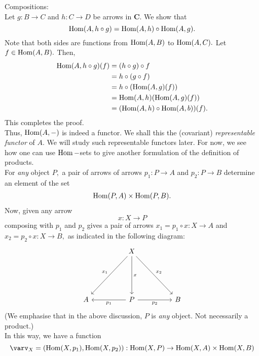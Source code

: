 Compositions:\\
Let $g:B\to C$ and $h:C\to D$ be arrows in $\mathbf{C}.$ We show that
\begin{equation*} 
	\operatorname{Hom}(A, h\circ g) = \operatorname{Hom}(A, h)\circ\operatorname{Hom}(A, g).
\end{equation*}
Note that both sides are functions from $\operatorname{Hom}(A, B)$ to $\operatorname{Hom}(A, C).$ Let $f \in \operatorname{Hom}(A, B).$ Then,
\begin{align*} 
	\operatorname{Hom}(A, h\circ g)(f) &= (h\circ g)\circ f\\
	&= h \circ (g \circ f)\\
	&= h \circ (\operatorname{Hom}(A, g)(f))\\
	&= \operatorname{Hom}(A, h)(\operatorname{Hom}(A, g)(f))\\
	&= (\operatorname{Hom}(A, h)\circ\operatorname{Hom}(A, b))(f).
\end{align*}
This completes the proof.\\
Thus, $\operatorname{Hom}(A, -)$ is indeed a functor. We shall this the (covariant) \emph{representable functor} of $A.$ We will study such representable functors later. For now, we see how one can use $\operatorname{Hom}-$sets to give another formulation of the definition of products.\\
For \emph{any} object $P,$ a pair of arrows of arrows $p_1:P\to A$ and $p_2:P\to B$ determine an element of the set
\begin{align*} 
	\operatorname{Hom}(P, A) \times \operatorname{Hom}(P, B).
\end{align*}
Now, given any arrow
\begin{equation*} 
	x:X \to P
\end{equation*}
composing with $p_1$ and $p_2$ gives a pair of arrows $x_1 = p_1\circ x: X \to A$ and $x_2 = p_2 \circ x:X \to B,$ as indicated in the following diagram:
\begin{equation*} 
	\begin{tikzcd}
	&& X \arrow[llddd, "x_1"'] \arrow[ddd, "x"] \arrow[rrddd, "x_2"] &&\\
	&&&&\\&&&&\\
	A && P \arrow[ll, "p_1"] \arrow[rr, "p_2"'] && B
	\end{tikzcd}
\end{equation*}
(We emphasise that in the above discussion, $P$ is \emph{any} object. Not necessarily a product.)\\
In this way, we have a function
\begin{equation*} 
	\varv_X = (\Hom(X, p_1), \Hom(X, p_2)) : \Hom(X, P) \to \Hom(X, A) \times \Hom(X, B)
\end{equation*}
